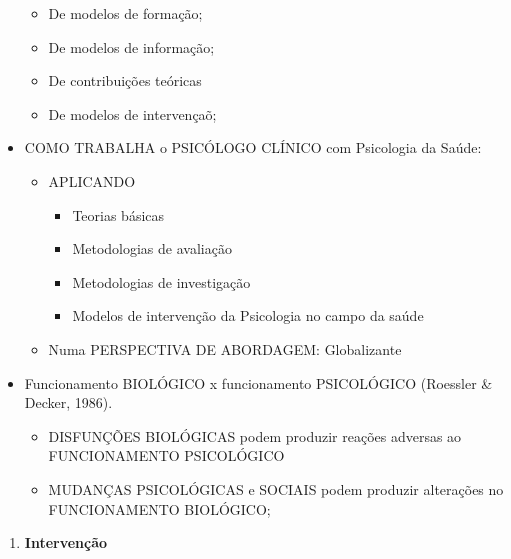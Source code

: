 \documentclass[
]{book}
\providecommand{\tightlist}{%
  \setlength{\itemsep}{0pt}\setlength{\parskip}{0pt}}
\begin{document}
\begin{itemize}
  \begin{itemize}
  \tightlist
  \item
    De modelos de formação;
  \item
    De modelos de informação;
  \item
    De contribuições teóricas
  \item
    De modelos de intervençaõ;
  \end{itemize}
\item
  COMO TRABALHA o PSICÓLOGO CLÍNICO com Psicologia da Saúde:

  \begin{itemize}
  \tightlist
  \item
    APLICANDO

    \begin{itemize}
    \tightlist
    \item
      Teorias básicas
    \item
      Metodologias de avaliação
    \item
      Metodologias de investigação
    \item
      Modelos de intervenção da Psicologia no campo da saúde
    \end{itemize}
  \item
    Numa PERSPECTIVA DE ABORDAGEM: Globalizante
  \end{itemize}
\item
  Funcionamento BIOLÓGICO x funcionamento PSICOLÓGICO (Roessler \&
  Decker, 1986).

  \begin{itemize}
  \tightlist
  \item
    DISFUNÇÕES BIOLÓGICAS podem produzir reações adversas ao
    FUNCIONAMENTO PSICOLÓGICO
  \item
    MUDANÇAS PSICOLÓGICAS e SOCIAIS podem produzir alterações no
    FUNCIONAMENTO BIOLÓGICO;
  \end{itemize}
\end{itemize}

\begin{enumerate}
\def\labelenumi{\arabic{enumi}.}
\setcounter{enumi}{2}
\tightlist
\item
  \textbf{Intervenção}
\end{enumerate}
\end{document}
